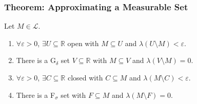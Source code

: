 \documentclass[9pt]{extarticle}
\newcommand{\R}{\mathbb{R}}
\begin{document}
  \subsubsection{Theorem: Approximating a Measurable Set}%
  Let $M\in\mathcal{L}$.
  \begin{enumerate}[(1)]
    \item $\forall \varepsilon > 0$, $\exists U\subseteq \R$ open with $M\subseteq U$ and $\lambda(U\setminus M) < \varepsilon$.
    \item There is a G$_{\delta}$ set $V\subseteq \R$ with $M\subseteq V$ and $\lambda(V\setminus M) = 0$.
    \item $\forall \varepsilon > 0$, $\exists C\subseteq \R$ closed with $C\subseteq M$ and $\lambda(M\setminus C) < \varepsilon$.
    \item There is a F$_{\sigma}$ set with $F\subseteq M$ and $\lambda(M\setminus F) = 0$.
  \end{enumerate}
\end{document}
